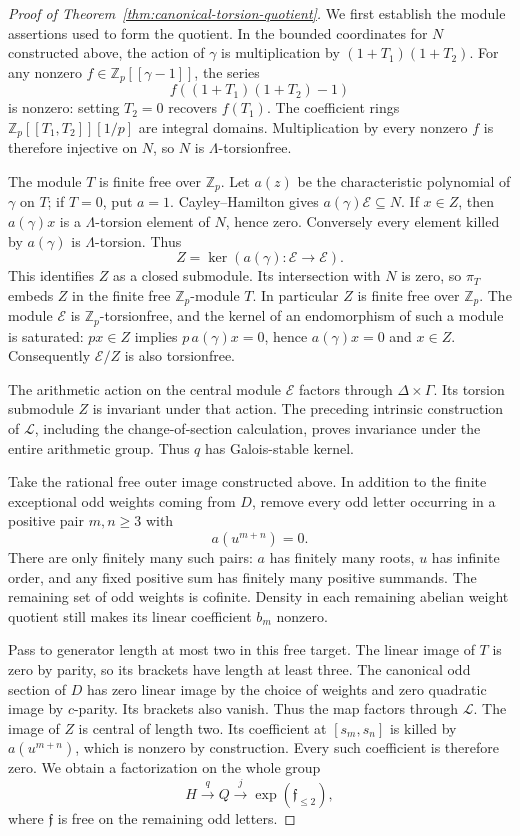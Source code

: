 \begin{proof}[Proof of Theorem~\ref{thm:canonical-torsion-quotient}]
We first establish the module assertions used to form the quotient.
In the bounded coordinates for $N$ constructed above, the action
of $\gamma$ is multiplication by $(1+T_1)(1+T_2)$.
For any nonzero $f\in\mathbb Z_p[[\gamma-1]]$, the series
\[
             f((1+T_1)(1+T_2)-1)
\]
is nonzero: setting $T_2=0$ recovers $f(T_1)$.
The coefficient rings $\mathbb Z_p[[T_1,T_2]][1/p]$ are
integral domains. Multiplication by every nonzero $f$ is
therefore injective on $N$, so $N$ is $\Lambda$-torsionfree.

The module $T$ is finite free over $\mathbb Z_p$.
Let $a(z)$ be the characteristic polynomial of $\gamma$ on
$T$; if $T=0$, put $a=1$. Cayley--Hamilton gives
$a(\gamma)\mathcal E\subseteq N$. If $x\in Z$, then
$a(\gamma)x$ is a $\Lambda$-torsion element of $N$, hence zero.
Conversely every element killed by $a(\gamma)$ is
$\Lambda$-torsion. Thus
\[
                     Z=\ker(a(\gamma):\mathcal E\to\mathcal E).
\]
This identifies $Z$ as a closed submodule. Its intersection
with $N$ is zero, so $\pi_T$ embeds $Z$ in the finite free
$\mathbb Z_p$-module $T$. In particular $Z$ is finite free
over $\mathbb Z_p$. The module $\mathcal E$ is
$\mathbb Z_p$-torsionfree, and the kernel of an endomorphism
of such a module is saturated: $px\in Z$ implies
$p\,a(\gamma)x=0$, hence $a(\gamma)x=0$ and $x\in Z$.
Consequently $\mathcal E/Z$ is also torsionfree.

The arithmetic action on the central module $\mathcal E$
factors through $\Delta\times\Gamma$. Its torsion submodule
$Z$ is invariant under that action. The preceding intrinsic
construction of $\mathcal L$, including the change-of-section
calculation, proves invariance under the entire arithmetic
group. Thus $q$ has Galois-stable kernel.

Take the rational free outer image constructed above. In
addition to the finite exceptional odd weights coming from
$D$, remove every odd letter occurring in a positive pair
$m,n\geq3$ with
\[
                              a(u^{m+n})=0.
\]
There are only finitely many such pairs: $a$ has finitely
many roots, $u$ has infinite order, and any fixed positive
sum has finitely many positive summands. The remaining
set of odd weights is cofinite. Density in each remaining
abelian weight quotient still makes its linear coefficient
$b_m$ nonzero.

Pass to generator length at most two in this free target.
The linear image of $T$ is zero by parity, so its brackets
have length at least three. The canonical odd section of $D$
has zero linear image by the choice of weights and zero
quadratic image by $c$-parity. Its brackets also vanish.
Thus the map factors through $\mathcal L$.
The image of $Z$ is central of length two. Its coefficient
at $[s_m,s_n]$ is killed by $a(u^{m+n})$, which is nonzero
by construction. Every such coefficient is therefore zero.
We obtain a factorization on the whole group
\[
 H\xrightarrow{q} Q\xrightarrow{j}
      \exp(\mathfrak f_{\leq2}),
\]
where $\mathfrak f$ is free on the remaining odd letters.


\end{proof}
